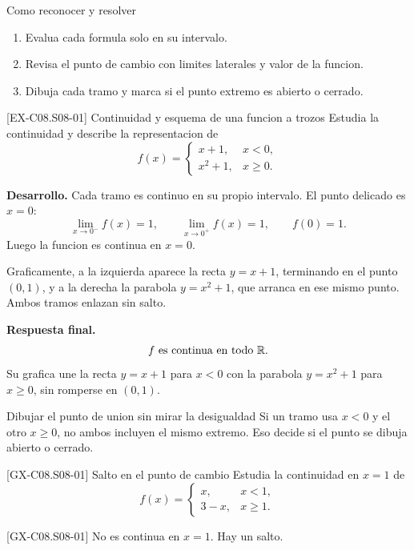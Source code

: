 \begin{methodbox}{Como reconocer y resolver}
\begin{enumerate}
  \item Evalua cada formula solo en su intervalo.
  \item Revisa el punto de cambio con limites laterales y valor de la funcion.
  \item Dibuja cada tramo y marca si el punto extremo es abierto o cerrado.
\end{enumerate}
\end{methodbox}

\begin{solvedexample}{[EX-C08.S08-01] Continuidad y esquema de una funcion a trozos}
Estudia la continuidad y describe la representacion de
\[
f(x)=
\begin{cases}
x+1,& x<0,\\
x^2+1,& x\geq 0.
\end{cases}
\]

\textbf{Desarrollo.} Cada tramo es continuo en su propio intervalo. El punto delicado es
\(x=0\):
\[
\lim_{x\to 0^-}f(x)=1,\qquad \lim_{x\to 0^+}f(x)=1,\qquad f(0)=1.
\]
Luego la funcion es continua en \(x=0\).

Graficamente, a la izquierda aparece la recta \(y=x+1\), terminando en el punto \((0,1)\), y
a la derecha la parabola \(y=x^2+1\), que arranca en ese mismo punto. Ambos tramos enlazan sin
salto.

\textbf{Respuesta final.}
\[
f \text{ es continua en todo }\mathbb{R}.
\]
Su grafica une la recta \(y=x+1\) para \(x<0\) con la parabola \(y=x^2+1\) para \(x\geq 0\),
sin romperse en \((0,1)\).
\end{solvedexample}

\begin{commonerror}{Dibujar el punto de union sin mirar la desigualdad}
Si un tramo usa \(x<0\) y el otro \(x\geq 0\), no ambos incluyen el mismo extremo. Eso decide
si el punto se dibuja abierto o cerrado.
\end{commonerror}

\begin{guidedexercise}{[GX-C08.S08-01] Salto en el punto de cambio}
Estudia la continuidad en \(x=1\) de
\[
f(x)=
\begin{cases}
x,& x<1,\\
3-x,& x\geq 1.
\end{cases}
\]
\end{guidedexercise}

\begin{shortanswer}{[GX-C08.S08-01]}
No es continua en \(x=1\). Hay un salto.
\end{shortanswer}

